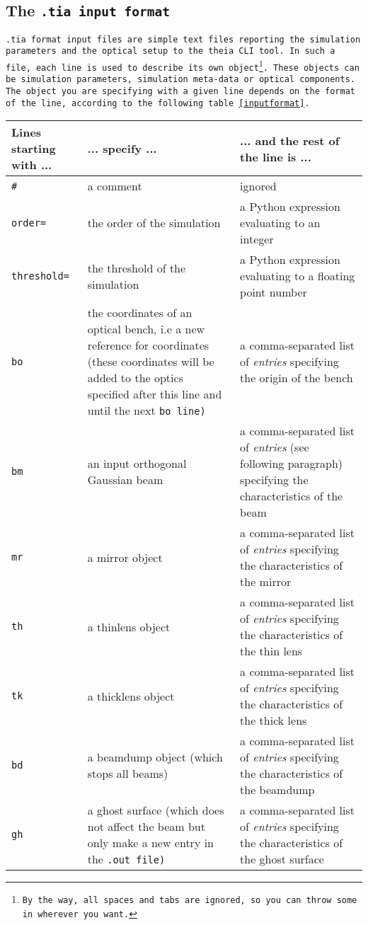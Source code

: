 \documentclass{article}
\begin{document}
\subsection{The \tt{.tia} input format}
\tt{.tia} format input files are simple text files reporting the simulation parameters and the optical setup to the \tt{theia} CLI tool. In such a file, each line is used to describe its own object\footnote{By the way, all spaces and tabs are ignored, so you can throw some in wherever you want.}. These objects can be simulation parameters, simulation meta-data or optical components. The object you are specifying with a given line depends on the format of the line, according to the following table \ref{inputformat}.

\begin{table}[h]
\begin{center}
\begin{tabular}{|p{3cm}|p{4cm}|p{8cm}|}
\hline
\textbf{Lines starting with ...} & \textbf{... specify ...} & \textbf{... and the rest of the line is ...} \\ \hline \hline

\tt{\#} & a comment & ignored \\ \hline

\tt{order=} & the order of the simulation & a Python expression evaluating to an integer \\ \hline
\tt{threshold=} & the threshold of the simulation & a Python expression evaluating to a floating point number  \\ \hline
\tt{bo} & the coordinates of an optical bench, i.e a new reference for coordinates (these coordinates will be added to the optics specified after this line and until the next \tt{bo}  line) & a comma-separated list of \textit{entries} specifying the origin of the bench \\ \hline
\tt{bm} & an input orthogonal Gaussian beam & a comma-separated list of \textit{entries}  (see following paragraph) specifying the characteristics of the beam \\ \hline
\tt{mr} & a mirror object & a comma-separated list of \textit{entries} specifying the characteristics of the mirror \\ \hline
\tt{th} & a thinlens object & a comma-separated list of \textit{entries} specifying the characteristics of the thin lens \\ \hline
\tt{tk} & a thicklens object & a comma-separated list of \textit{entries} specifying the characteristics of the thick lens \\ \hline
\tt{bd} & a beamdump object (which stops all beams) & a comma-separated list of \textit{entries} specifying the characteristics of the beamdump \\ \hline
\tt{gh} & a ghost surface (which does not affect the beam but only make a new entry in the \tt{.out} file) & a comma-separated list of \textit{entries} specifying the characteristics of the ghost surface \\ \hline


\end{tabular}
\end{center}
\end{table}
\end{document}
